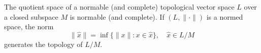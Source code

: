 The quotient space of a normable (and complete) topological vector space $L$ over a closed subspace $M$ is normable (and complete). If $(L, \|\cdot\|)$ is a normed space, the norm
$$\|\hat{x}\| = \inf\{\|x\| : x \in \hat{x}\}, \quad \hat{x} \in L/M$$
generates the topology of $L/M$.
